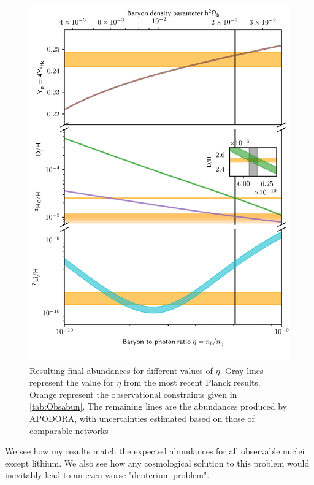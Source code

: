 \begin{figure}[ht]
    \includegraphics[width=5.1in]{figures/etaplot.pdf}
    \caption{Resulting final abundances for different values of $\eta$. Gray lines represent the value for $\eta$ from the most recent Planck results\cite{Planck}. Orange represent the observational constraints given in \cref{tab:Obsabun}. The remaining lines are the abundances produced by APODORA, with uncertainties estimated based on those of comparable networks}
    \label{fig:etaplot}
\end{figure}

We see how my results match the expected abundances for all observable nuclei except lithium. We also see how any cosmological solution to this problem would inevitably lead to an even worse "deuterium problem". 
\clearpage
